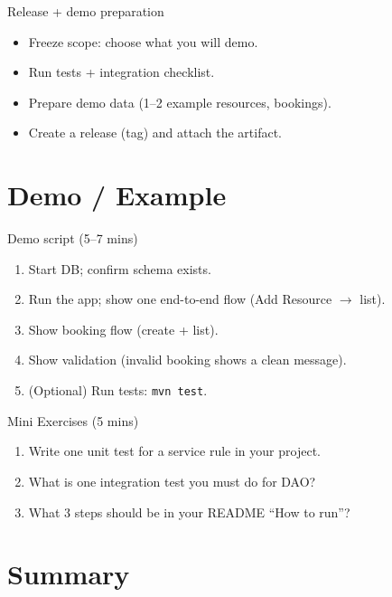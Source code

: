 \documentclass{beamer}
\begin{document}
\begin{frame}{Release + demo preparation}
  \begin{itemize}[<+->]
    \item Freeze scope: choose what you will demo.
    \item Run tests + integration checklist.
    \item Prepare demo data (1--2 example resources, bookings).
    \item Create a release (tag) and attach the artifact.
  \end{itemize}
  \slidesources{\OOPSUnitVISources}
\end{frame}

\section{Demo / Example}
\label{sec:demo}

\begin{frame}{Demo script (5--7 mins)}
  \begin{enumerate}[<+->]
    \item Start DB; confirm schema exists.
    \item Run the app; show one end-to-end flow (Add Resource $\rightarrow$ list).
    \item Show booking flow (create + list).
    \item Show validation (invalid booking shows a clean message).
    \item (Optional) Run tests: \texttt{mvn test}.
  \end{enumerate}
  \slidesources{\OOPSUnitVISources}
\end{frame}

\begin{frame}{Mini Exercises (5 mins)}
  \begin{enumerate}[<+->]
    \item Write one unit test for a service rule in your project.
    \item What is one integration test you must do for DAO?
    \item What 3 steps should be in your README ``How to run''?
  \end{enumerate}
  \slidesources{\OOPSUnitVISources}
\end{frame}


\section{Summary}
\label{sec:summary}
\end{document}
